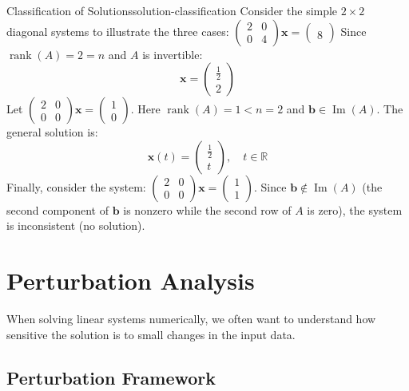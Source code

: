 \begin{example}{Classification of Solutions}{solution-classification}
    Consider the simple $2 \times 2$ diagonal systems to illustrate the three cases: $\begin{pmatrix} 2 & 0 \\ 0 & 4 \end{pmatrix} \mathbf{x} = \begin{pmatrix} \\ 8 \end{pmatrix}$
    Since $\operatorname{rank}(A) = 2 = n$ and $A$ is invertible:
    \[
        \mathbf{x} = \begin{pmatrix} \frac12 \\ 2 \end{pmatrix} \tag{unique solution}
    \]
    Let $\begin{pmatrix} 2 & 0 \\ 0 & 0 \end{pmatrix} \mathbf{x} = \begin{pmatrix} 1 \\ 0 \end{pmatrix}$. Here $\operatorname{rank}(A) = 1 < n = 2$ and $\mathbf{b} \in \operatorname{Im}(A)$. The general solution is:
    \[
        \mathbf{x}(t) = \begin{pmatrix} \frac12 \\ t \end{pmatrix}, \quad t \in \mathbb{R} \tag{infinitely many solutions}
    \]
    Finally, consider the system: $\begin{pmatrix} 2 & 0 \\ 0 & 0 \end{pmatrix} \mathbf{x} = \begin{pmatrix} 1 \\ 1 \end{pmatrix}$.
    Since $\mathbf{b} \notin \operatorname{Im}(A)$ (the second component of $\mathbf{b}$ is nonzero while the second row of $A$ is zero), the system is inconsistent (no solution).
\end{example}

\section{Perturbation Analysis}
When solving linear systems numerically, we often want to understand how sensitive the solution is to small changes in the input data.

\subsection{Perturbation Framework}

